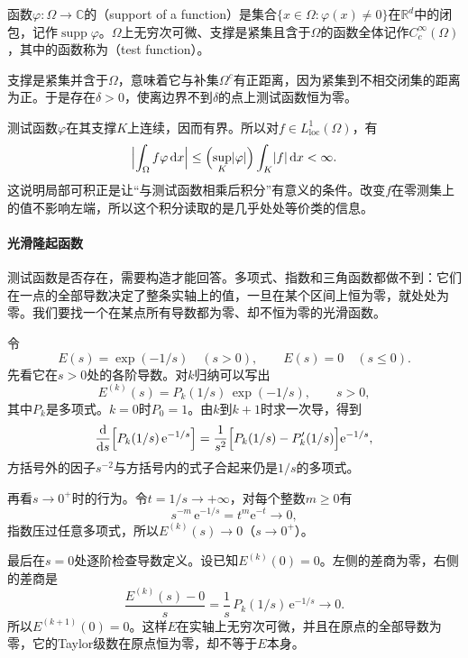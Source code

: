 \begin{definition}[支撑与测试函数]
\label{def:weakd-test-function}
函数$\varphi:\Omega\to\mathbb C$的（support of a function）是集合$\{x\in\Omega:\varphi(x)\neq0\}$在$\mathbb R^d$中的闭包，记作$\operatorname{supp}\varphi$。$\Omega$上无穷次可微、支撑是紧集且含于$\Omega$的函数全体记作$C_c^\infty(\Omega)$，其中的函数称为（test function）。
\end{definition}

支撑是紧集并含于$\Omega$，意味着它与补集$\Omega^{c}$有正距离，因为紧集到不相交闭集的距离为正。于是存在$\delta>0$，使离边界不到$\delta$的点上测试函数恒为零。

测试函数$\varphi$在其支撑$K$上连续，因而有界。所以对$f\in L^1_{\mathrm{loc}}(\Omega)$，有
\begin{equation}
\Bigl\lvert\int_\Omega f\varphi\,\mathrm dx\Bigr\rvert\leq\Bigl(\sup_{K}\lvert\varphi\rvert\Bigr)\int_K\lvert f\rvert\,\mathrm dx<\infty .
\label{eq:weakd-local-pairing}
\end{equation}
这说明局部可积正是让“与测试函数相乘后积分”有意义的条件。改变$f$在零测集上的值不影响左端，所以这个积分读取的是几乎处处等价类的信息。

\paragraph{光滑隆起函数}
测试函数是否存在，需要构造才能回答。多项式、指数和三角函数都做不到：它们在一点的全部导数决定了整条实轴上的值，一旦在某个区间上恒为零，就处处为零。我们要找一个在某点所有导数都为零、却不恒为零的光滑函数。

令
\[
E(s)=\exp(-1/s)\quad(s>0),\qquad E(s)=0\quad(s\leq0).
\]
先看它在$s>0$处的各阶导数。对$k$归纳可以写出
\[
E^{(k)}(s)=P_k(1/s)\,\exp(-1/s),\qquad s>0,
\]
其中$P_k$是多项式。$k=0$时$P_0=1$。由$k$到$k+1$时求一次导，得到
\[
\frac{\mathrm d}{\mathrm ds}\Bigl[P_k(1/s)\,\mathrm e^{-1/s}\Bigr]
=\frac{1}{s^2}\Bigl[P_k(1/s)-P_k'(1/s)\Bigr]\mathrm e^{-1/s},
\]
方括号外的因子$s^{-2}$与方括号内的式子合起来仍是$1/s$的多项式。

再看$s\to0^+$时的行为。令$t=1/s\to+\infty$，对每个整数$m\geq0$有
\[
s^{-m}\,\mathrm e^{-1/s}=t^m\mathrm e^{-t}\to0 ,
\]
指数压过任意多项式，所以$E^{(k)}(s)\to0$（$s\to0^+$）。

最后在$s=0$处逐阶检查导数定义。设已知$E^{(k)}(0)=0$。左侧的差商为零，右侧的差商是
\[
\frac{E^{(k)}(s)-0}{s}=\frac1s\,P_k(1/s)\,\mathrm e^{-1/s}\to0 .
\]
所以$E^{(k+1)}(0)=0$。这样$E$在实轴上无穷次可微，并且在原点的全部导数为零，它的Taylor级数在原点恒为零，却不等于$E$本身。

